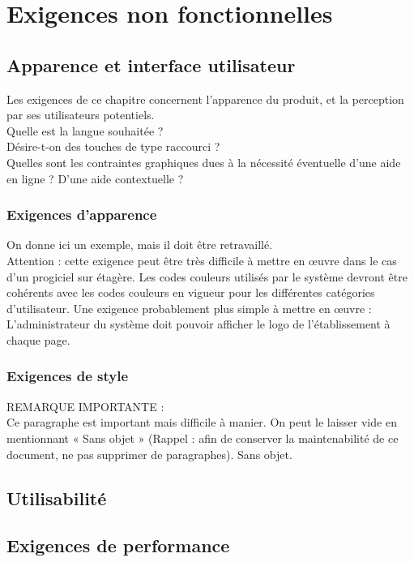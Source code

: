 	\section{Exigences non fonctionnelles}
		\subsection{Apparence et interface utilisateur}
		Les exigences de ce chapitre concernent l’apparence du produit, et la perception par ses utilisateurs potentiels. \\
		Quelle est la langue souhaitée ?\\
		Désire-t-on des touches de type raccourci ?\\
		Quelles sont les contraintes graphiques dues à la nécessité éventuelle d’une aide en ligne ? D’une aide contextuelle ?
		
			\subsubsection{Exigences d’apparence} 
			On donne ici un exemple, mais il doit être retravaillé.\\
			Attention : cette exigence peut être très difficile à mettre en œuvre dans le cas d’un progiciel sur étagère.
			Les codes couleurs utilisés par le système devront être cohérents avec les codes couleurs en vigueur pour les différentes catégories d’utilisateur.
			Une exigence probablement plus simple à mettre en œuvre :\\
			L’administrateur du système doit pouvoir afficher le logo de l’établissement à chaque page.
		
			\subsubsection{Exigences de style}
			REMARQUE IMPORTANTE :\\
			Ce paragraphe est important mais difficile à manier. On peut le laisser vide en mentionnant « Sans objet » (Rappel : afin de conserver la maintenabilité de ce document, ne pas supprimer de paragraphes).
			Sans objet.

		\subsection{Utilisabilité}
		
		\subsection{Exigences de performance}
		
